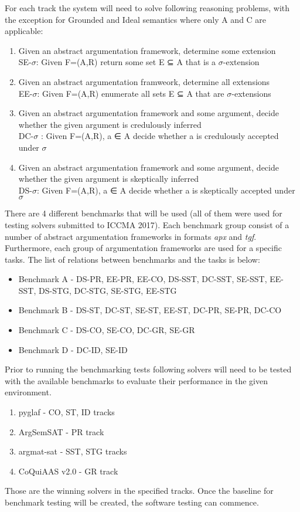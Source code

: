For each track the system will need to solve following reasoning problems, with the exception for Grounded and Ideal semantics where only A and C are applicable:
\begin{enumerate}[label=\Alph*]
	\item{Given an abstract argumentation framework, determine some extension\\SE-$\sigma$: Given F=(A,R) return some set E ⊆ A that is a $\sigma$-extension}
	\item{Given an abstract argumentation framweork, determine all extensions\\EE-$\sigma$: Given F=(A,R) enumerate all sets E ⊆ A that are $\sigma$-extensions}
	\item{Given an abstract argumentation framework and some argument, decide whether the given argument is credulously inferred\\DC-$\sigma$ : Given F=(A,R), a ∈ A decide whether a is credulously accepted under $\sigma$}
	\item{Given an abstract argumentation framework and some argument, decide whether the given argument is skeptically inferred\\DS-$\sigma$: Given F=(A,R), a ∈ A decide whether a is skeptically accepted under $\sigma$}
\end{enumerate}

There are 4 different benchmarks that will be used  (all of them were used for testing solvers submitted to ICCMA 2017). Each benchmark group consist of a number of abstract argumentation frameworks in formats \textit{apx} and \textit{tgf}. Furthermore, each group of argumentation frameworks are used for a specific tasks. The list of relations between benchmarks and the tasks is below:
\begin{itemize}
	\item{Benchmark A - DS-PR, EE-PR, EE-CO, DS-SST, DC-SST, SE-SST, EE-SST, DS-STG, DC-STG, SE-STG, EE-STG}
	\item{Benchmark B - DS-ST, DC-ST, SE-ST, EE-ST, DC-PR, SE-PR, DC-CO}
	\item{Benchmark C - DS-CO, SE-CO, DC-GR, SE-GR}
	\item{Benchmark D - DC-ID, SE-ID}
\end{itemize}

Prior to running the benchmarking tests following solvers will need to be tested with the available benchmarks to evaluate their performance in the given environment.
\begin{enumerate}
	\item{pyglaf - CO, ST, ID tracks}
	\item{ArgSemSAT - PR track}
	\item{argmat-sat - SST, STG tracks}
	\item{CoQuiAAS v2.0 - GR track}
\end{enumerate}
Those are the winning solvers in the specified tracks. Once the baseline for benchmark testing will be created, the software testing can commence.
